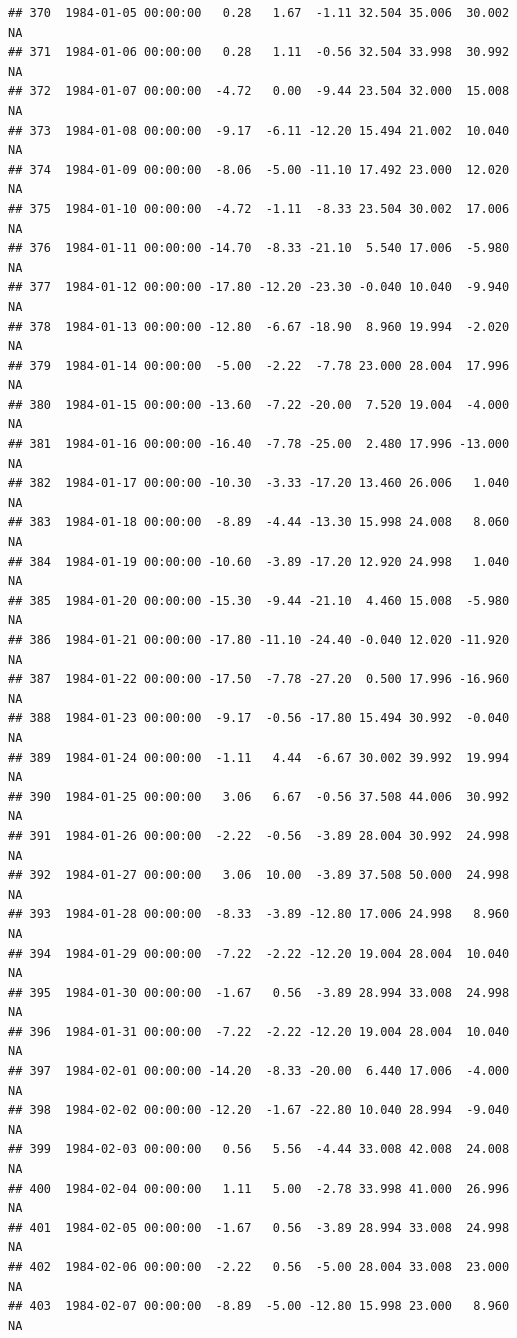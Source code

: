 \documentclass{article}\usepackage{graphicx, color}
\makeatletter
\newenvironment{kframe}{%
 \def\at@end@of@kframe{}%
 \ifinner\ifhmode%
  \def\at@end@of@kframe{\end{minipage}}%
  \begin{minipage}{\columnwidth}%
 \fi\fi%
 \def\FrameCommand##1{\hskip\@totalleftmargin \hskip-\fboxsep
 \colorbox{shadecolor}{##1}\hskip-\fboxsep
     \hskip-\linewidth \hskip-\@totalleftmargin \hskip\columnwidth}%
 \MakeFramed {\advance\hsize-\width
   \@totalleftmargin\z@ \linewidth\hsize
   \@setminipage}}%
 {\par\unskip\endMakeFramed%
 \at@end@of@kframe}
\newenvironment{knitrout}{}{} %
\makeatother
\begin{document}
\begin{knitrout}
\begin{kframe}
\begin{verbatim}
## 370  1984-01-05 00:00:00   0.28   1.67  -1.11 32.504 35.006  30.002     NA
## 371  1984-01-06 00:00:00   0.28   1.11  -0.56 32.504 33.998  30.992     NA
## 372  1984-01-07 00:00:00  -4.72   0.00  -9.44 23.504 32.000  15.008     NA
## 373  1984-01-08 00:00:00  -9.17  -6.11 -12.20 15.494 21.002  10.040     NA
## 374  1984-01-09 00:00:00  -8.06  -5.00 -11.10 17.492 23.000  12.020     NA
## 375  1984-01-10 00:00:00  -4.72  -1.11  -8.33 23.504 30.002  17.006     NA
## 376  1984-01-11 00:00:00 -14.70  -8.33 -21.10  5.540 17.006  -5.980     NA
## 377  1984-01-12 00:00:00 -17.80 -12.20 -23.30 -0.040 10.040  -9.940     NA
## 378  1984-01-13 00:00:00 -12.80  -6.67 -18.90  8.960 19.994  -2.020     NA
## 379  1984-01-14 00:00:00  -5.00  -2.22  -7.78 23.000 28.004  17.996     NA
## 380  1984-01-15 00:00:00 -13.60  -7.22 -20.00  7.520 19.004  -4.000     NA
## 381  1984-01-16 00:00:00 -16.40  -7.78 -25.00  2.480 17.996 -13.000     NA
## 382  1984-01-17 00:00:00 -10.30  -3.33 -17.20 13.460 26.006   1.040     NA
## 383  1984-01-18 00:00:00  -8.89  -4.44 -13.30 15.998 24.008   8.060     NA
## 384  1984-01-19 00:00:00 -10.60  -3.89 -17.20 12.920 24.998   1.040     NA
## 385  1984-01-20 00:00:00 -15.30  -9.44 -21.10  4.460 15.008  -5.980     NA
## 386  1984-01-21 00:00:00 -17.80 -11.10 -24.40 -0.040 12.020 -11.920     NA
## 387  1984-01-22 00:00:00 -17.50  -7.78 -27.20  0.500 17.996 -16.960     NA
## 388  1984-01-23 00:00:00  -9.17  -0.56 -17.80 15.494 30.992  -0.040     NA
## 389  1984-01-24 00:00:00  -1.11   4.44  -6.67 30.002 39.992  19.994     NA
## 390  1984-01-25 00:00:00   3.06   6.67  -0.56 37.508 44.006  30.992     NA
## 391  1984-01-26 00:00:00  -2.22  -0.56  -3.89 28.004 30.992  24.998     NA
## 392  1984-01-27 00:00:00   3.06  10.00  -3.89 37.508 50.000  24.998     NA
## 393  1984-01-28 00:00:00  -8.33  -3.89 -12.80 17.006 24.998   8.960     NA
## 394  1984-01-29 00:00:00  -7.22  -2.22 -12.20 19.004 28.004  10.040     NA
## 395  1984-01-30 00:00:00  -1.67   0.56  -3.89 28.994 33.008  24.998     NA
## 396  1984-01-31 00:00:00  -7.22  -2.22 -12.20 19.004 28.004  10.040     NA
## 397  1984-02-01 00:00:00 -14.20  -8.33 -20.00  6.440 17.006  -4.000     NA
## 398  1984-02-02 00:00:00 -12.20  -1.67 -22.80 10.040 28.994  -9.040     NA
## 399  1984-02-03 00:00:00   0.56   5.56  -4.44 33.008 42.008  24.008     NA
## 400  1984-02-04 00:00:00   1.11   5.00  -2.78 33.998 41.000  26.996     NA
## 401  1984-02-05 00:00:00  -1.67   0.56  -3.89 28.994 33.008  24.998     NA
## 402  1984-02-06 00:00:00  -2.22   0.56  -5.00 28.004 33.008  23.000     NA
## 403  1984-02-07 00:00:00  -8.89  -5.00 -12.80 15.998 23.000   8.960     NA

\end{verbatim}
\end{kframe}
\end{knitrout}
\end{document}
